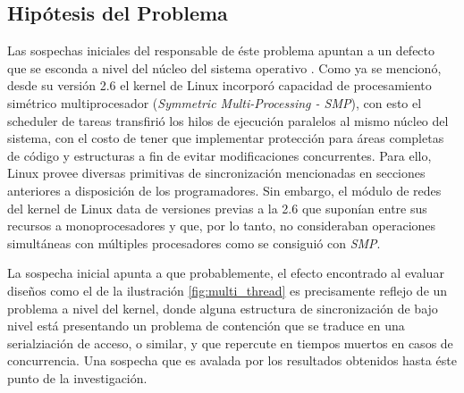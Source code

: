 \subsection{Hipótesis del Problema}
Las sospechas iniciales del responsable de éste problema apuntan a un defecto que se esconda a nivel del núcleo del sistema operativo \cite{paper:toshiba,post:facebook}. Como ya se mencionó, desde su versión 2.6 el kernel de Linux incorporó capacidad de procesamiento simétrico multiprocesador (\emph{Symmetric Multi-Processing - SMP}), con esto el scheduler de tareas transfirió los hilos de ejecución paralelos al mismo núcleo del sistema, con el costo de tener que implementar protección para áreas completas de código y estructuras a fin de evitar modificaciones concurrentes. Para ello, Linux provee diversas primitivas de sincronización mencionadas en secciones anteriores a disposición de los programadores. Sin embargo, el módulo de redes del kernel de Linux data de versiones previas a la 2.6 que suponían entre sus recursos a monoprocesadores y que, por lo tanto, no consideraban operaciones simultáneas con múltiples procesadores como se consiguió con \emph{SMP}.

La sospecha inicial apunta a que probablemente, el efecto encontrado al evaluar diseños como el de la ilustración \ref{fig:multi_thread} es precisamente reflejo de un problema a nivel del kernel, donde alguna estructura de sincronización de bajo nivel está presentando un problema de contención que se traduce en una serialziación de acceso, o similar, y que repercute en tiempos muertos en casos de concurrencia. Una sospecha que es avalada por los resultados obtenidos hasta éste punto de la investigación.

